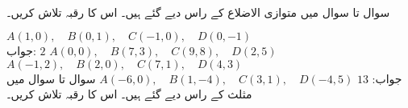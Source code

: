 \\
سوال  تا سوال  میں متوازی الاضلاع کے راس دیے گئے ہیں۔ اس کا رقبہ تلاش کریں۔

$A(1,0),\quad B(0,1),\quad C(-1,0),\quad D(0,-1)$\\
جواب:\quad
$2$
$A(0,0),\quad B(7,3),\quad C(9,8),\quad D(2,5)$
$A(-1,2),\quad B(2,0),\quad C(7,1),\quad D(4,3)$\\
جواب:\quad
$13$
$A(-6,0),\quad B(1,-4),\quad C(3,1),\quad D(-4,5)$
سوال  تا سوال  میں مثلث کے راس دیے گئے ہیں۔ اس کا رقبہ تلاش کریں۔

